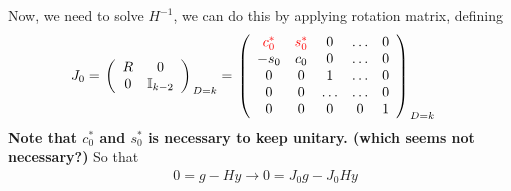 Now, we need to solve $H^{-1}$, we can do this by applying rotation matrix, defining
\begin{equation}
\begin{split}
&J_0=
{\left.\left(\begin{array}{cc}
 R & 0 \\
0 & \mathbb{I}_{k-2} \\
\end{array}\right)\right. }_{D=k}
={\left.\left(\begin{array}{ccccc}
\textcolor[rgb]{1,0,0}{c_0^*} & \textcolor[rgb]{1,0,0}{s_0^*} & 0 & \ldots & 0 \\
-s_0 & c_0 & 0 & \ldots & 0 \\
0 & 0 & 1 & \ldots & 0 \\
0 & 0 & \ldots & \ldots & 0 \\
0 & 0 & 0 & 0 & 1 \\
\end{array}\right)\right. }_{D=k}
\end{split}
\end{equation}
\textbf{Note that $c_0^*$ and $s_0^*$ is necessary to keep unitary. (which seems not necessary?)} So that
\begin{equation}
\begin{split}
&0=g-Hy\to 0=J_0g-J_0Hy\\
\end{split}
\end{equation}


